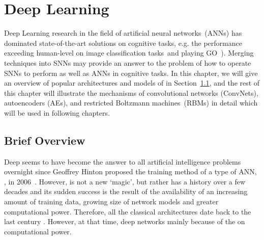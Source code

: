 \chapter{Deep Learning}
\label{cha:dnn}
Deep Learning research in the field of artificial neural networks~(ANNs) has dominated state-of-the-art solutions on cognitive tasks, e.g. the performance exceeding human-level  on image classification tasks~\DIFdelbegin {}\DIFdelend \DIFaddbegin {}\DIFaddend and playing GO~\DIFdelbegin {}\DIFdelend \DIFaddbegin {}\DIFaddend ).
Merging \DIFdelbegin {}\DIFdelend \DIFaddbegin {}\DIFaddend techniques into SNNs may provide an answer to the problem of how to operate SNNs to perform as well as ANNs in cognitive tasks. 
In this chapter, we will give an overview of popular architectures and models of \DIFdelbegin {}\DIFdelend \DIFaddbegin {}\DIFaddend in Section~\ref{sec:dl_history}, and the rest of this chapter will illustrate the mechanisms of convolutional networks (ConvNets), autoencoders (AEs), and restricted Boltzmann machines~(RBMs) in detail which will be used in following chapters.

\section{Brief Overview}
\label{sec:dl_history}
Deep \DIFdelbegin {}\DIFdelend \DIFaddbegin {}\DIFaddend seems to have become the answer to all artificial intelligence problems overnight since Geoffrey Hinton proposed the training method of a type of ANN, \DIFdelbegin {}\DIFdelend \DIFaddbegin {}\DIFaddend , in 2006~\DIFdelbegin {}\DIFdelend \DIFaddbegin {}\DIFaddend .
However, \DIFdelbegin {}\DIFdelend \DIFaddbegin {}\DIFaddend is not a new `magic', but rather has a history over a few decades and its sudden success is the result of the availability of an increasing amount of training data, \DIFaddbegin {}\DIFaddend growing size of network models and greater computational power.
Therefore, all the classical \DIFdelbegin {}\DIFdelend \DIFaddbegin {}\DIFaddend architectures date back to the last century \DIFdelbegin {}\DIFdelend \DIFaddbegin {}\DIFaddend .
However, at that time, deep networks \DIFdelbegin {}\DIFdelend \DIFaddbegin {}\DIFaddend mainly because of the \DIFdelbegin {}\DIFdelend \DIFaddbegin {}\DIFaddend on computational power.


